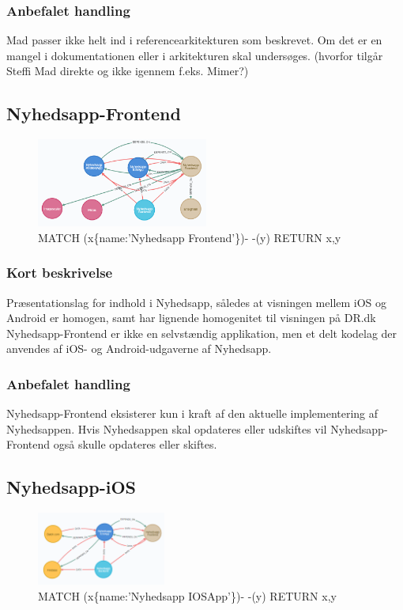 \documentclass{article}
\begin{document}
\subsubsection{Anbefalet handling}
Mad passer ikke helt ind i referencearkitekturen som beskrevet. Om det er en mangel i dokumentationen eller i arkitekturen skal undersøges. (hvorfor tilgår Steffi Mad direkte og ikke igennem f.eks. Mimer?)


\subsection{Nyhedsapp-Frontend}
\begin{figure}[h]
\includegraphics[width=160pt]{Nyhedsapp-Frontend.PNG}
\caption{MATCH (x\{name:'Nyhedsapp Frontend'\})- -(y) RETURN x,y}
\end{figure}
\subsubsection{Kort beskrivelse}
Præsentationslag for indhold i Nyhedsapp, således at visningen mellem iOS og Android er homogen, samt har lignende homogenitet til visningen på DR.dk
Nyhedsapp-Frontend er ikke en selvstændig applikation, men et delt kodelag der anvendes af iOS- og Android-udgaverne af Nyhedsapp. 
\subsubsection{Anbefalet handling}
Nyhedsapp-Frontend eksisterer kun i kraft af den aktuelle implementering af Nyhedsappen. Hvis Nyhedsappen skal opdateres eller udskiftes vil Nyhedsapp-Frontend også skulle opdateres eller skiftes.


\subsection{Nyhedsapp-iOS}
\begin{figure}[h]
\includegraphics[width=120pt]{Nyhedsapp-IOS.PNG}
\caption{MATCH (x\{name:'Nyhedsapp IOSApp'\})- -(y) RETURN x,y}
\end{figure}
\end{document}
